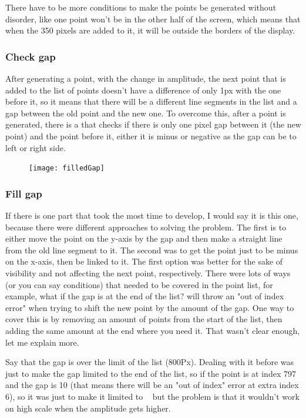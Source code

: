 There have to be more conditions to make the points be generated without disorder, like one point won't be in the other half of the screen, which means that when the 350 pixels are added to it, it will be outside the borders of the display.


\subsubsection{Check gap}
After generating a point, with the change in amplitude, the next point that is added to the list of points doesn't have a difference of only 1px with the one before it, so it means that there will be a different line segments in the list and a gap between the old point and the new one. To overcome this, after a point is generated, there is a  that checks if there is only one pixel gap between it (the new point) and the point before it, either it is minus or negative as the gap can be to left or right side.

\begin{figure}[H]
	\texttt{[image: filledGap]}
\end{figure}

\subsubsection{Fill gap}
If there is one part that took the most time to develop, I would say it is this one, because there were different approaches to solving the problem. The first is to either move the point on the y-axis by the gap and then make a straight line from the old line segment to it. The second was to get the point just to be minus on the x-axis, then be linked to it. The first option was better for the sake of visibility and not affecting the next point, respectively. There were lots of ways (or you can say conditions) that needed to be covered in the point list, for example, what if the gap is at the end of the list? will throw an "out of index error" when trying to shift the new point by the amount of the gap. One way to cover this is by removing an amount of points from the start of the list, then adding the same amount at the end where you need it. That wasn't clear enough, let me explain more.

Say that the gap is over the limit of the list (800Px). Dealing with it before was just to make the gap limited to the end of the list, so if the point is at index 797 and the gap is 10 (that means there will be an "out of index" error at extra index 6), so it was just to make it limited to   but the problem is that it wouldn't work on high scale when the amplitude gets higher.

